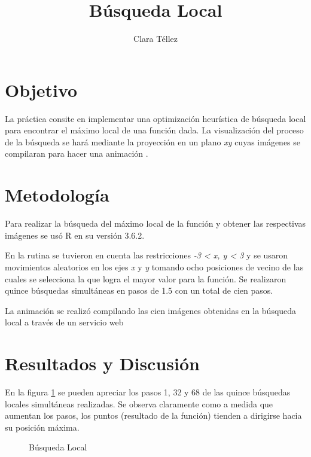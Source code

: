 \documentclass{article}
\begin{document}
\title{\textbf{B\'usqueda Local}}
\author{Clara T\'ellez}
\maketitle

\section{Objetivo}\label{obj}

 La pr\'actica consite en implementar una optimizaci\'on heur\'istica de b\'usqueda local para encontrar el m\'aximo local de una funci\'on dada.  La visualizaci\'on del proceso de la b\'usqueda se har\'a  mediante la proyecci\'on en un  plano \textit{xy} cuyas im\'agenes se compilaran para hacer una animaci\'on \cite{eli}.

\section{Metodolog\'ia}\label{met}

Para realizar la b\'usqueda del m\'aximo local de la funci\'on y obtener las respectivas im\'agenes se us\'o R en su versi\'on 3.6.2.


En la rutina se tuvieron en cuenta las restricciones \textit{-3 < x, y < 3} y se usaron movimientos aleatorios en los ejes \textit{x} y \textit{y} tomando ocho posiciones de vecino de las cuales se selecciona la que logra el mayor valor para la funci\'on.  Se realizaron quince b\'usquedas simult\'aneas en pasos de 1.5 con un total de cien pasos.

La animaci\'on se realiz\'o compilando las cien im\'agenes obtenidas en la b\'usqueda local a trav\'es de un servicio web \cite{gif}


\section{Resultados y Discusi\'on}\label{res}

En la figura \ref{f1} se pueden apreciar los pasos 1, 32 y 68 de las quince b\'usquedas locales simult\'aneas realizadas.  Se observa claramente como a medida que aumentan los pasos, los puntos (resultado de la funci\'on) tienden a dirigirse hacia su posici\'on m\'axima.

\begin{figure}[htbp]
\centering
{}
\caption{B\'usqueda Local} \label{f1}
\end{figure}
\end{document}
